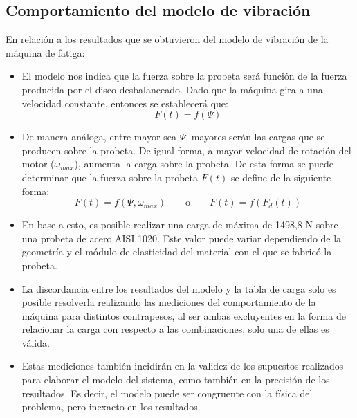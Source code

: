 \subsection{Comportamiento del modelo de vibración}
En relación a los resultados que se obtuvieron del modelo de vibración de la máquina de fatiga:
\begin{itemize}
	\item El modelo nos indica que la fuerza sobre la probeta será función de la fuerza producida por el disco desbalanceado. Dado que la máquina gira a una velocidad constante, entonces se establecerá que:
	\begin{equation*}
		F(t) = f(\Psi)
	\end{equation*}
	\item De manera análoga, entre mayor sea $\Psi$, mayores serán las cargas que se producen sobre la probeta. De igual forma, a mayor velocidad de rotación del motor ($\omega_{max}$), aumenta la carga sobre la probeta. De esta forma se puede determinar que la fuerza sobre la probeta $F(t)$ se define de la siguiente forma:
	\begin{equation*}
		F(t) = f (\Psi, \omega_{max}) \qquad \text{o} \qquad F(t) = f(F_d(t))
	\end{equation*}
	\item En base a esto, es posible realizar una carga de máxima de 1498,8 N sobre una probeta de acero AISI 1020. Este valor puede variar dependiendo de la geometría y el módulo de elasticidad del material con el que se fabricó la probeta.
	\item La discordancia entre los resultados del modelo y la tabla de carga solo es posible resolverla realizando las mediciones del comportamiento de la máquina para distintos contrapesos, al ser ambas excluyentes en la forma de relacionar la carga con respecto a las combinaciones, solo una de ellas es válida.
	\item Estas mediciones también incidirán en la validez de los supuestos realizados para elaborar el modelo del sistema, como también en la precisión de los resultados. Es decir, el modelo puede ser congruente con la física del problema, pero inexacto en los resultados.
\end{itemize}

